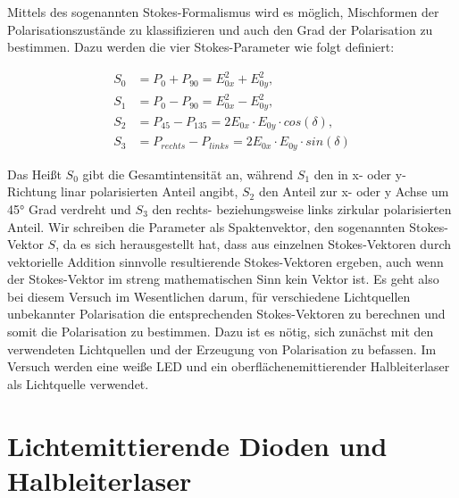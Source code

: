 \documentclass[bigchapter,colorback,accentcolor=tud4b,linedtoc,11pt]{tudreport}
\begin{document}
Mittels des sogenannten Stokes-Formalismus wird es möglich, Mischformen der Polarisationszustände zu klassifizieren und auch den Grad der Polarisation zu bestimmen. Dazu werden die vier Stokes-Parameter wie folgt definiert:

\begin{align*}
  S_0 &= P_{0} + P_{90} = E_{0x}^2 + E_{0y}^2,\\
  S_1 &= P_{0} - P_{90} = E_{0x}^2 - E_{0y}^2,\\
  S_2 &= P_{45} - P_{135} = 2E_{0x} \cdot E_{0y} \cdot cos(\delta),\\
  S_3 &= P_{rechts} - P_{links} = 2E_{0x} \cdot E_{0y} \cdot sin(\delta)
\end{align*}

Das Heißt $S_0$ gibt die Gesamtintensität an, während $S_1$ den in x- oder y- Richtung linar polarisierten Anteil angibt, $S_2$ den Anteil zur x- oder y Achse um 45° Grad verdreht und $S_3$ den rechts- beziehungsweise links zirkular polarisierten Anteil. Wir schreiben die Parameter als Spaktenvektor, den sogenannten Stokes-Vektor $S$, da es sich herausgestellt hat, dass aus einzelnen Stokes-Vektoren durch vektorielle Addition sinnvolle resultierende Stokes-Vektoren ergeben, auch wenn der Stokes-Vektor im streng mathematischen Sinn kein Vektor ist.
Es geht also bei diesem Versuch im Wesentlichen darum, für verschiedene Lichtquellen unbekannter Polarisation die entsprechenden Stokes-Vektoren zu berechnen und somit die Polarisation zu bestimmen. Dazu ist es nötig, sich zunächst mit den verwendeten Lichtquellen und der Erzeugung von Polarisation zu befassen. Im Versuch werden eine weiße LED und ein oberflächenemittierender Halbleiterlaser als Lichtquelle verwendet. 


\section{Lichtemittierende Dioden und Halbleiterlaser}
\end{document}
